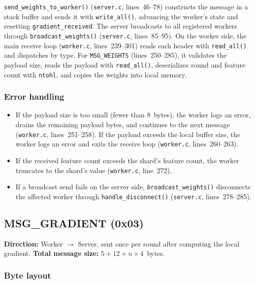 \documentclass[11pt]{article}
\begin{document}
\texttt{send\_weights\_to\_worker()} (\texttt{server.c}, lines~46--78) constructs the message in a stack buffer and sends it with \texttt{write\_all()}, advancing the worker's state and resetting \texttt{gradient\_received}. The server broadcasts to all registered workers through \texttt{broadcast\_weights()} (\texttt{server.c}, lines~85--95). On the worker side, the main receive loop (\texttt{worker.c}, lines~239--301) reads each header with \texttt{read\_all()} and dispatches by type. For \texttt{MSG\_WEIGHTS} (lines~250--285), it validates the payload size, reads the payload with \texttt{read\_all()}, deserializes round and feature count with \texttt{ntohl}, and copies the weights into local memory.

\subsubsection*{Error handling}

\begin{itemize}
  \item If the payload size is too small (fewer than 8~bytes), the worker logs an error, drains the remaining payload bytes, and continues to the next message (\texttt{worker.c}, lines~251--258). If the payload exceeds the local buffer size, the worker logs an error and exits the receive loop (\texttt{worker.c}, lines~260--263).
  \item If the received feature count exceeds the shard's feature count, the worker truncates to the shard's value (\texttt{worker.c}, line~272).
  \item If a broadcast send fails on the server side, \texttt{broadcast\_weights()} disconnects the affected worker through \texttt{handle\_disconnect()} (\texttt{server.c}, lines~278--285).
\end{itemize}

\subsection{MSG\_GRADIENT (0x03)}

\textbf{Direction:} Worker $\to$ Server, sent once per round after computing the local gradient.
\textbf{Total message size:} $5 + 12 + n \times 4$~bytes.

\subsubsection*{Byte layout}
\end{document}
